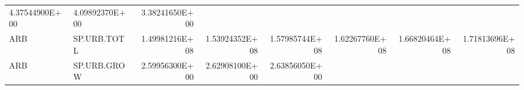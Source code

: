 \documentclass[]{article}
\begin{document}
\begin{longtable}[]{@{}llrrrrrr@{}}
\begin{minipage}[t]{0.11\columnwidth}
4.37544900E+00\strut
\end{minipage} & \begin{minipage}[t]{0.11\columnwidth}\raggedleft\strut
4.09892370E+00\strut
\end{minipage} & \begin{minipage}[t]{0.11\columnwidth}\raggedleft\strut
3.38241650E+00\strut
\end{minipage}\tabularnewline
\begin{minipage}[t]{0.06\columnwidth}\raggedright\strut
ARB\strut
\end{minipage} & \begin{minipage}[t]{0.08\columnwidth}\raggedright\strut
SP.URB.TOTL\strut
\end{minipage} & \begin{minipage}[t]{0.11\columnwidth}\raggedleft\strut
1.49981216E+08\strut
\end{minipage} & \begin{minipage}[t]{0.11\columnwidth}\raggedleft\strut
1.53924352E+08\strut
\end{minipage} & \begin{minipage}[t]{0.11\columnwidth}\raggedleft\strut
1.57985744E+08\strut
\end{minipage} & \begin{minipage}[t]{0.11\columnwidth}\raggedleft\strut
1.62267760E+08\strut
\end{minipage} & \begin{minipage}[t]{0.11\columnwidth}\raggedleft\strut
1.66820464E+08\strut
\end{minipage} & \begin{minipage}[t]{0.11\columnwidth}\raggedleft\strut
1.71813696E+08\strut
\end{minipage}\tabularnewline
\begin{minipage}[t]{0.06\columnwidth}\raggedright\strut
ARB\strut
\end{minipage} & \begin{minipage}[t]{0.08\columnwidth}\raggedright\strut
SP.URB.GROW\strut
\end{minipage} & \begin{minipage}[t]{0.11\columnwidth}\raggedleft\strut
2.59956300E+00\strut
\end{minipage} & \begin{minipage}[t]{0.11\columnwidth}\raggedleft\strut
2.62908100E+00\strut
\end{minipage} & \begin{minipage}[t]{0.11\columnwidth}\raggedleft\strut
2.63856050E+00\strut

\end{minipage}
\end{longtable}
\end{document}
